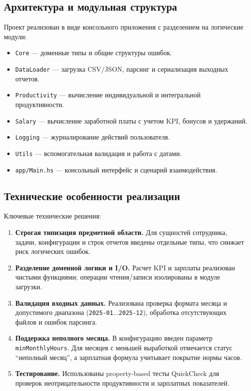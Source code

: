 \documentclass[a4paper,14pt]{extarticle}
\begin{document}
\subsection{Архитектура и модульная структура}
Проект реализован в виде консольного приложения с разделением на логические модули:
\begin{itemize}
  \item \texttt{Core} --- доменные типы и общие структуры ошибок.
  \item \texttt{DataLoader} --- загрузка CSV/JSON, парсинг и сериализация выходных отчетов.
  \item \texttt{Productivity} --- вычисление индивидуальной и интегральной продуктивности.
  \item \texttt{Salary} --- вычисление заработной платы с учетом KPI, бонусов и удержаний.
  \item \texttt{Logging} --- журналирование действий пользователя.
  \item \texttt{Utils} --- вспомогательная валидация и работа с датами.
  \item \texttt{app/Main.hs} --- консольный интерфейс и сценарий взаимодействия.
\end{itemize}

\subsection{Технические особенности реализации}
Ключевые технические решения:
\begin{enumerate}
  \item \textbf{Строгая типизация предметной области.} Для сущностей сотрудника, задачи, конфигурации и строк отчетов введены отдельные типы, что снижает риск логических ошибок.
  \item \textbf{Разделение доменной логики и I/O.} Расчет KPI и зарплаты реализован чистыми функциями; операции чтения/записи изолированы в модуле загрузки.
  \item \textbf{Валидация входных данных.} Реализована проверка формата месяца и допустимого диапазона (\texttt{2025-01}...\texttt{2025-12}), обработка отсутствующих файлов и ошибок парсинга.
  \item \textbf{Поддержка неполного месяца.} В конфигурацию введен параметр \texttt{minMonthlyHours}. Для месяцев с меньшей выработкой отмечается статус ``неполный месяц'', а зарплатная формула учитывает покрытие нормы часов.
  \item \textbf{Тестирование.} Использованы property-based тесты QuickCheck для проверок неотрицательности продуктивности и зарплатных показателей.
\end{enumerate}
\end{document}
